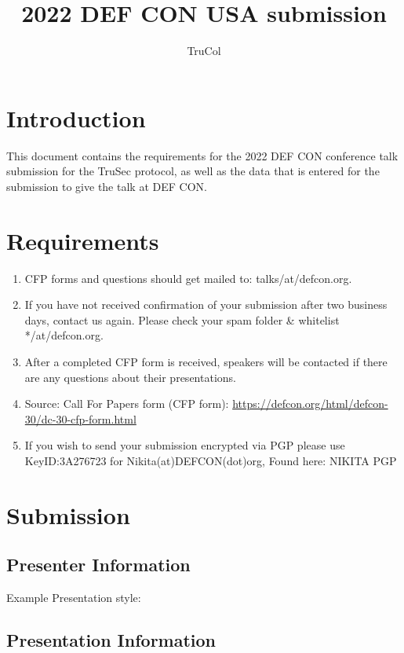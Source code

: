 \documentclass{article}
\title{2022 DEF CON USA submission}
\author{TruCol}
\begin{document}
\maketitle
\section{Introduction}
This document contains the requirements for the 2022 DEF CON conference talk submission for the TruSec protocol, as well as the data that is entered for the submission to give the talk at DEF CON.
\section{Requirements}
\begin{enumerate}
    \item CFP forms and questions should get mailed to: talks/at/defcon.org.
    \item If you have not received confirmation of your submission after two business days, contact us again. Please check your spam folder & whitelist */at/defcon.org. 
    \item After a completed CFP form is received, speakers will be contacted if there are any questions about their presentations.
    \item Source: Call For Papers form (CFP form): \url{https://defcon.org/html/defcon-30/dc-30-cfp-form.html}
    \item If you wish to send your submission encrypted via PGP please use KeyID:3A276723 for Nikita(at)DEFCON(dot)org, Found here: NIKITA PGP

\end{enumerate}


\section{Submission}
\subsection{Presenter Information}
Example Presentation style:
\subsection{Presentation Information}
\end{document}
